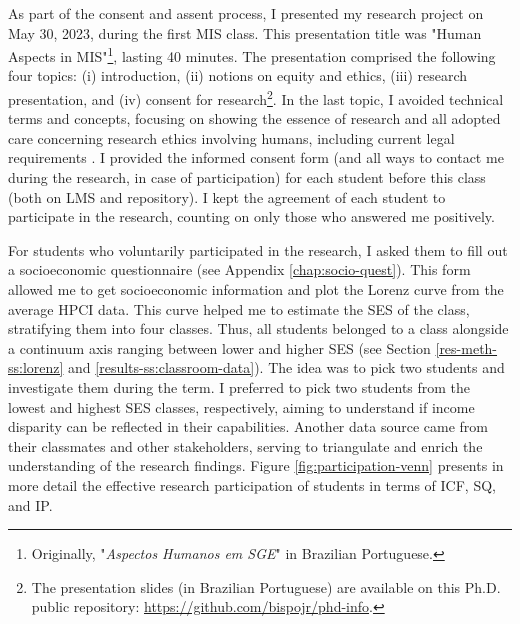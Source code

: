 As part of the consent and assent process, I presented my research project on May 30, 2023, during the first \gls{MIS} class. This presentation title was "Human Aspects in MIS"\footnote{Originally, "\textit{Aspectos Humanos em SGE}" in Brazilian Portuguese.}, lasting 40 minutes. The presentation comprised the following four topics: (i) introduction, (ii) notions on equity and ethics, (iii) research presentation, and (iv) consent for research\footnote{The presentation slides (in Brazilian Portuguese) are available on this \gls{Ph.D.} public repository: \url{https://github.com/bispojr/phd-info}.}. In the last topic, I avoided technical terms and concepts, focusing on showing the essence of research and all adopted care concerning research ethics involving humans, including current legal requirements \cite{bispojr:2021-wei}. I provided the informed consent form (and all ways to contact me during the research, in case of participation) for each student before this class (both on \gls{LMS} and repository). I kept the agreement of each student to participate in the research, counting on only those who answered me positively.

For students who voluntarily participated in the research, I asked them to fill out a socioeconomic questionnaire (see Appendix \ref{chap:socio-quest}). This form allowed me to get socioeconomic information and plot the Lorenz curve from the average \acrfull{HPCI} data. This curve helped me to estimate the \gls{SES} of the class, stratifying them into four classes. Thus, all students belonged to a class alongside a continuum axis ranging between lower and higher \gls{SES} (see Section \ref{res-meth-ss:lorenz} and \ref{results-ss:classroom-data}). The idea was to pick two students and investigate them during the term. I preferred to pick two students from the lowest and highest SES classes, respectively, aiming to understand if income disparity can be reflected in their capabilities. Another data source came from their classmates and other stakeholders, serving to triangulate and enrich the understanding of the research findings. Figure \ref{fig:participation-venn} presents in more detail the effective research participation of students in terms of \gls{ICF}, \gls{SQ}, and \gls{IP}.

